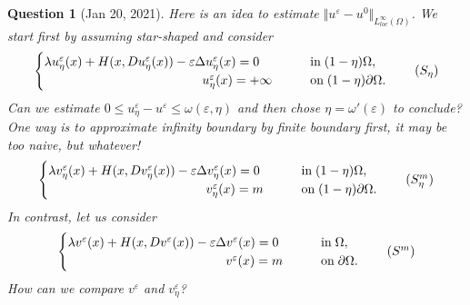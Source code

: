 \documentclass[11pt,reqno]{amsart}
\numberwithin{figure}{section}
\theoremstyle{plain}
\newtheorem{quest}{Question}
\theoremstyle{remark}
\numberwithin{equation}{section}
\begin{document}
\begin{quest}[Jan 20, 2021] Here is an idea to estimate $\Vert u^\varepsilon - u^0\Vert_{L^\infty_{loc}(\Omega)}$. We start first by assuming star-shaped and consider
\begin{equation}\label{e:S_eta}
    \begin{cases}
    \lambda u_\eta^\varepsilon(x) + H(x,Du_\eta^\varepsilon(x)) - \varepsilon \Delta u_\eta^\varepsilon(x) = 0 &\qquad
    \text{in}\;(1-\eta)\Omega, \vspace{0cm}\\
    \qquad\qquad\qquad\qquad\qquad\qquad\;\, u^\varepsilon_\eta(x) = +\infty &\qquad
    \text{on}\;(1-\eta)\partial\Omega.
    \end{cases} \tag{$S_\eta$}
\end{equation}
Can we estimate $0\leq u^\varepsilon_\eta - u^\varepsilon \leq \omega(\varepsilon,\eta)$ and then chose $\eta = \omega'(\varepsilon)$ to conclude? One way is to approximate infinity boundary by finite boundary first, it may be too naive, but whatever! 
\begin{equation}\label{e:S_eta_m}
    \begin{cases}
    \lambda v_\eta^\varepsilon(x) + H(x,Dv_\eta^\varepsilon(x)) - \varepsilon \Delta v_\eta^\varepsilon(x) = 0 &\qquad
    \text{in}\;(1-\eta)\Omega, \vspace{0cm}\\
    \qquad\qquad\qquad\qquad\qquad\qquad\;\, v^\varepsilon_\eta(x) = m &\qquad
    \text{on}\;(1-\eta)\partial\Omega.
    \end{cases} \tag{$S_{\eta}^m$}
\end{equation}
In contrast, let us consider
\begin{equation}\label{e:S_0}
    \begin{cases}
    \lambda v^\varepsilon(x) + H(x,Dv^\varepsilon(x)) - \varepsilon \Delta v^\varepsilon(x) = 0 &\qquad
    \text{in}\;\Omega, \vspace{0cm}\\
    \qquad\qquad\qquad\qquad\qquad\qquad\;\, v^\varepsilon(x) = m &\qquad
    \text{on}\;\partial\Omega.
    \end{cases} \tag{$S^m$}
\end{equation}
How can we compare $v^\varepsilon$ and $v^\varepsilon_\eta$?
\end{quest}
\end{document}
